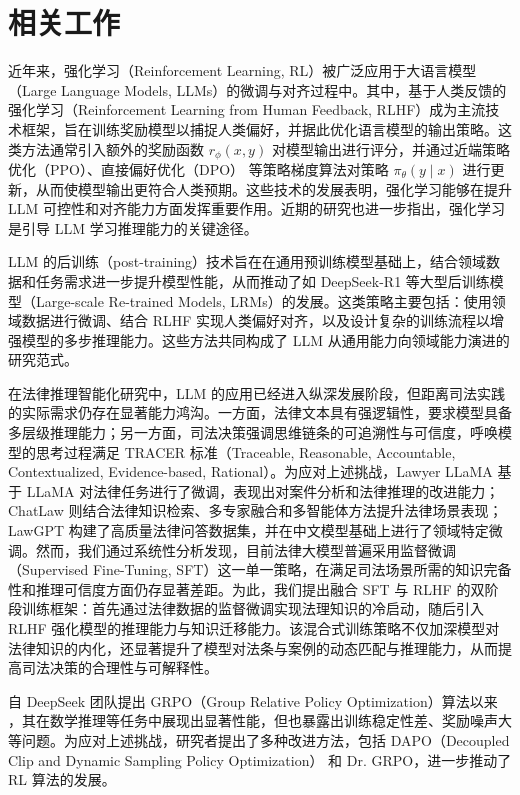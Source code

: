 \documentclass{pkuthesis}
\begin{document}
\section{相关工作}



近年来，强化学习（Reinforcement Learning, RL）被广泛应用于大语言模型（Large Language Models, LLMs）的微调与对齐过程中。其中，基于人类反馈的强化学习（Reinforcement Learning from Human Feedback, RLHF）成为主流技术框架，旨在训练奖励模型以捕捉人类偏好，并据此优化语言模型的输出策略。这类方法通常引入额外的奖励函数 $r_{\phi}(x, y)$ 对模型输出进行评分，并通过近端策略优化（PPO）\cite{schulman2017proximal}、直接偏好优化（DPO）\cite{rafailov2023direct} 等策略梯度算法对策略 $\pi_{\theta}(y \mid x)$ 进行更新，从而使模型输出更符合人类预期。这些技术的发展表明，强化学习能够在提升 LLM 可控性和对齐能力方面发挥重要作用。近期的研究也进一步指出，强化学习是引导 LLM 学习推理能力的关键途径。

LLM 的后训练（post-training）技术旨在在通用预训练模型基础上，结合领域数据和任务需求进一步提升模型性能，从而推动了如 DeepSeek-R1\cite{guo2025deepseek} 等大型后训练模型（Large-scale Re-trained Models, LRMs）的发展。这类策略主要包括：使用领域数据进行微调、结合 RLHF 实现人类偏好对齐，以及设计复杂的训练流程以增强模型的多步推理能力。这些方法共同构成了 LLM 从通用能力向领域能力演进的研究范式。

在法律推理智能化研究中，LLM 的应用已经进入纵深发展阶段，但距离司法实践的实际需求仍存在显著能力鸿沟。一方面，法律文本具有强逻辑性，要求模型具备多层级推理能力；另一方面，司法决策强调思维链条的可追溯性与可信度，呼唤模型的思考过程满足 TRACER 标准（Traceable, Reasonable, Accountable, Contextualized, Evidence-based, Rational）。为应对上述挑战，Lawyer LLaMA\cite{huang2023lawyer} 基于 LLaMA 对法律任务进行了微调，表现出对案件分析和法律推理的改进能力；ChatLaw\cite{cui2023chatlaw} 则结合法律知识检索、多专家融合和多智能体方法提升法律场景表现；LawGPT\cite{zhou2024lawgpt} 构建了高质量法律问答数据集，并在中文模型基础上进行了领域特定微调。然而，我们通过系统性分析发现，目前法律大模型普遍采用监督微调（Supervised Fine-Tuning, SFT）这一单一策略，在满足司法场景所需的知识完备性和推理可信度方面仍存显著差距。为此，我们提出融合 SFT 与 RLHF 的双阶段训练框架：首先通过法律数据的监督微调实现法理知识的冷启动，随后引入 RLHF 强化模型的推理能力与知识迁移能力。该混合式训练策略不仅加深模型对法律知识的内化，还显著提升了模型对法条与案例的动态匹配与推理能力，从而提高司法决策的合理性与可解释性。

自 DeepSeek 团队提出 GRPO（Group Relative Policy Optimization）算法以来 \cite{shao2024deepseekmath}，其在数学推理等任务中展现出显著性能，但也暴露出训练稳定性差、奖励噪声大等问题。为应对上述挑战，研究者提出了多种改进方法，包括 DAPO（Decoupled Clip and Dynamic Sampling Policy Optimization）\cite{yu2025dapo} 和 Dr. GRPO\cite{liu2025understanding}，进一步推动了 RL 算法的发展。
\end{document}
